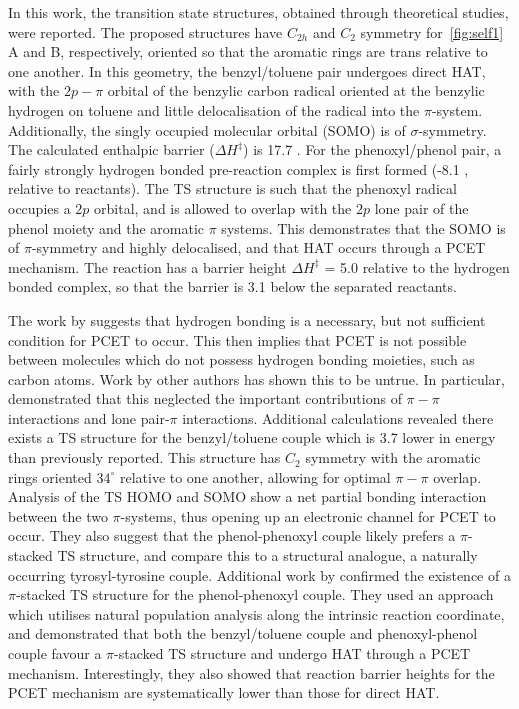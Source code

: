 In this work, the transition state structures, obtained through theoretical studies, were reported. The proposed structures have $C_{2h}$ and $C_2$ symmetry for~\ref{fig:self1} A and B, respectively, oriented so that the aromatic rings are trans relative to one another. In this geometry, the benzyl/toluene pair undergoes direct HAT, with the $2p-\pi$ orbital of the benzylic carbon radical oriented at the benzylic hydrogen on toluene and little delocalisation of the radical into the $\pi$-system. Additionally, the singly occupied molecular orbital (SOMO) is of $\sigma$-symmetry. The calculated enthalpic barrier ($\Delta H^{\ddagger}$) is 17.7 \kcalmol. For the phenoxyl/phenol pair, a fairly strongly hydrogen bonded pre-reaction complex is first formed (-8.1 \kcalmol, relative to reactants).
The TS structure is such that the phenoxyl radical occupies a $2p$ orbital, and is allowed to overlap with the $2p$ lone pair of the phenol moiety and the aromatic $\pi$ systems. This demonstrates that the SOMO is of $\pi$-symmetry and highly delocalised, and that HAT occurs through a PCET mechanism. The reaction has a barrier height $\Delta H^{\ddagger}$ = 5.0 \kcalmol relative to the hydrogen bonded complex, so that the barrier is 3.1 \kcalmol below the separated reactants.

The work by \citet{Mayer2002} suggests that hydrogen bonding is a necessary, but not sufficient condition for PCET to occur. This then implies that PCET is not possible between molecules which do not possess hydrogen bonding moieties, such as carbon atoms. Work by other authors has shown this to be untrue.\cite{Hatcher2007, DiLabio2007} In particular, \citet{DiLabio2007} demonstrated that this neglected the important contributions of $\pi-\pi$ interactions and lone pair-$\pi$ interactions. Additional calculations revealed there exists a TS structure for the benzyl/toluene couple which is 3.7 \kcalmol lower in energy than previously reported. This structure has $C_2$ symmetry with the aromatic rings oriented $34^\circ$ relative to one another, allowing for optimal $\pi-\pi$ overlap.
Analysis of the TS HOMO and SOMO show a net partial bonding interaction between the two $\pi$-systems, thus opening up an electronic channel for PCET to occur. They also suggest that the phenol-phenoxyl couple likely prefers a $\pi$-stacked TS structure, and compare this to a structural analogue, a naturally occurring tyrosyl-tyrosine couple. Additional work by \citet{MunozRugeles2017} confirmed the existence of a $\pi$-stacked TS structure for the phenol-phenoxyl couple. They used an approach which utilises natural population analysis along the intrinsic reaction coordinate, and demonstrated that both the benzyl/toluene couple and phenoxyl-phenol couple favour a $\pi$-stacked TS structure and undergo HAT through a PCET mechanism. Interestingly, they also showed that reaction barrier heights for the PCET mechanism are systematically lower than those for direct HAT.\\

